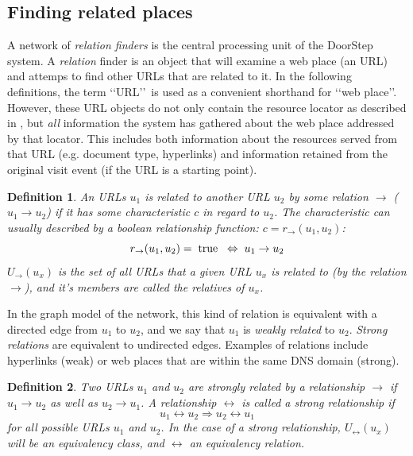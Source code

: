 \documentclass[a4paper]{danarticle}
\newtheorem{definition}{Definition}
\theoremstyle{remark}
\begin{document}
     \subsection{Finding related places} 
       A network of \textit{relation finders} is the central processing unit of 
       the DoorStep system. A \textit{relation} finder is an object that will 
       examine a web place (an URL) and attemps to find other URLs that are 
       related to it. In the following definitions, the term \lq\lq URL\rq\rq\ 
       is used as a convenient shorthand for \lq\lq web place\rq\rq . However, 
       these URL objects do not only contain the resource locator as described 
       in \cite{url}, but \emph{all} information the system has gathered about 
       the web place addressed by that locator. This includes both information 
       about  the resources served from that URL (e.g. document type, hyperlinks) 
       and information retained from the original visit event (if the URL is a 
       starting point).
       \begin{definition}
       An URLs $ u_1 $ is related to another URL $ u_2 $ by some relation 
       $ \rightarrow $
       ($ u_1 \rightarrow u_2 $) if it has some characteristic $ c $ in regard
       to $ u_2 $. The characteristic can usually described by a boolean
       relationship function: $ c = r_{\rightarrow}(u_1, u_2) $:
       \[
         r_{\rightarrow}(u_1, u_2) = \hspace{1mm} \mbox{true} \hspace{2mm} 
	     \Leftrightarrow \hspace{1mm} u_1 \rightarrow u_2
       \]
       $ U_{\rightarrow}(u_x) $ is the set of all URLs that a given URL $ u_x $ 
       is related to (by the relation $ \rightarrow $), and it's members are 
       called the \emph{relatives} of $ u_x $.
       \end{definition}
       In the graph model of the network, this kind of relation is equivalent
       with a directed edge from $ u_1 $ to $ u_2 $, and we say that $ u_1 $ is
       \textit{weakly related} to $ u_2 $. \textit{Strong relations} are
       equivalent to undirected edges.
       Examples of relations include hyperlinks (weak) or web places that are
       within the same DNS domain (strong). 
       \begin{definition}
       Two URLs $ u_1 $ and $ u_2 $ are \emph{strongly related} by a relationship
       $ \rightarrow $ if $ u_1 \rightarrow u_2 $ as well as 
       $ u_2 \rightarrow u_1 $. A relationship $ \leftrightarrow $ is called a
       \emph{strong} relationship if
       \[
         u_1 \leftrightarrow u_2 \Rightarrow u_2 \leftrightarrow u_1 
       \]
       for all possible URLs $ u_1 $ and $ u_2 $. In the case of a strong 
       relationship, $ U_{\leftrightarrow}(u_x) $ will be an equivalency 
       class, and $ \leftrightarrow $ an equivalency relation.
       \end{definition}
\end{document}
